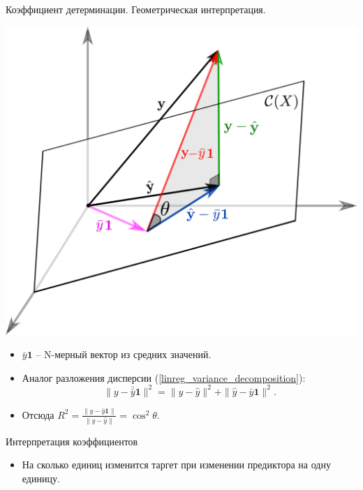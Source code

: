 \documentclass[9pt]{beamer}
\begin{document}
\begin{frame}{Коэффициент детерминации. Геометрическая интерпретация.}
\begin{center}
    \includegraphics[height=0.5\textheight]{img/linear_regression_determination_coefficient.png}
\end{center}
\begin{itemize}
    \item $\bar y\textbf{1}$ -- N-мерный вектор из средних значений.
    \item Аналог разложения дисперсии (\ref{linreg_variance_decomposition}):
    $$\|y-\bar \bar y\textbf{1}\|^2 = \|y-\hat y\|^2 + \|\hat y - \bar y\textbf{1}\|^2.$$
    \item Отсюда $R^2 = \frac{\|\hat y - \bar y\textbf{1}\|}{\|y-\hat y\|} = \cos^2\theta$.
\end{itemize}
\end{frame}

\begin{frame}{Интерпретация коэффициентов}
\begin{itemize}
    \item На сколько единиц изменится таргет при изменении предиктора на одну единицу.
\end{itemize}
\end{frame}
\end{document}
